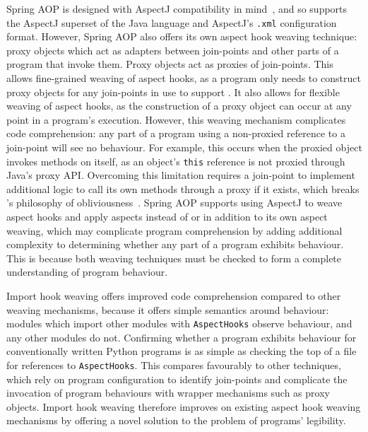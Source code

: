 Spring AOP is designed with AspectJ compatibility in
mind~\cite{introducing_spring_aop_chapter_integration_with_aspectj}, and so
supports the AspectJ superset of the Java language and AspectJ's
\lstinline{.xml} configuration format. However, Spring AOP also offers its own
aspect hook weaving technique: proxy objects which act as adapters between
join-points and other parts of a program that invoke them. Proxy objects act as
proxies of join-points. This allows fine-grained weaving of aspect hooks, as a
program only needs to construct proxy objects for any join-points in use to
support \aop{}. It also allows for flexible weaving of aspect hooks, as the
construction of a proxy object can occur at any point in a program's execution.
However, this weaving mechanism complicates code comprehension: any part of a
program using a non-proxied reference to a join-point will see no
\aspectoriented behaviour. For example, this occurs when the proxied object
invokes methods on itself, as an object's \lstinline{this} reference is not
proxied through Java's proxy API. Overcoming this limitation requires a
join-point to implement additional logic to call its own methods through a proxy
if it exists, which breaks \aop{}'s philosophy of
obliviousness~\cite{filman2000aspect}. Spring AOP supports using AspectJ to
weave aspect hooks and apply aspects instead of or in addition to its own aspect
weaving, which may complicate program comprehension by adding additional
complexity to determining whether any part of a program exhibits \aspectoriented
behaviour. This is because both weaving techniques must be checked to form a complete
understanding of program behaviour. 

Import hook weaving offers improved code comprehension compared to other weaving
mechanisms, because it offers simple semantics around \aspectoriented behaviour:
modules which import other modules with \lstinline{AspectHooks} observe
\aspectoriented behaviour, and any other modules do not. Confirming whether a
program exhibits \aspectoriented behaviour for conventionally written Python
programs is as simple as checking the top of a file for references to
\lstinline{AspectHooks}. This compares favourably to other techniques, which
rely on program configuration to identify join-points and complicate the
invocation of \aspectoriented program behaviours with wrapper mechanisms such as
proxy objects. Import hook weaving therefore improves on existing aspect hook
weaving mechanisms by offering a novel solution to the problem of
\aspectoriented programs' legibility.



